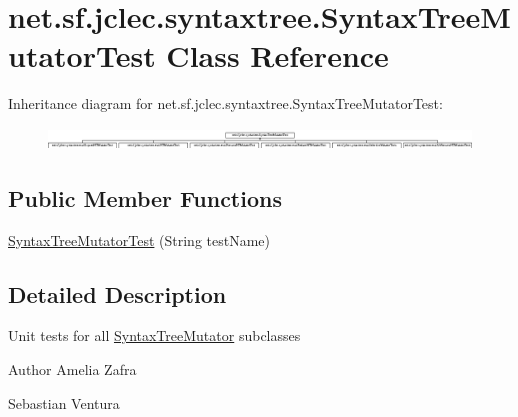 \hypertarget{classnet_1_1sf_1_1jclec_1_1syntaxtree_1_1_syntax_tree_mutator_test}{\section{net.\-sf.\-jclec.\-syntaxtree.\-Syntax\-Tree\-Mutator\-Test Class Reference}
\label{classnet_1_1sf_1_1jclec_1_1syntaxtree_1_1_syntax_tree_mutator_test}
}
Inheritance diagram for net.\-sf.\-jclec.\-syntaxtree.\-Syntax\-Tree\-Mutator\-Test\-:\begin{figure}[H]
\begin{center}
\leavevmode
\includegraphics[height=0.581516cm]{classnet_1_1sf_1_1jclec_1_1syntaxtree_1_1_syntax_tree_mutator_test}
\end{center}
\end{figure}
\subsection*{Public Member Functions}
\begin{DoxyCompactItemize}
\item 
\hyperlink{classnet_1_1sf_1_1jclec_1_1syntaxtree_1_1_syntax_tree_mutator_test_a60193d8579421146df20dbf3b2946672}{Syntax\-Tree\-Mutator\-Test} (String test\-Name)
\end{DoxyCompactItemize}


\subsection{Detailed Description}
Unit tests for all \hyperlink{classnet_1_1sf_1_1jclec_1_1syntaxtree_1_1_syntax_tree_mutator}{Syntax\-Tree\-Mutator} subclasses

\begin{DoxyAuthor}{Author}
Amelia Zafra 

Sebastian Ventura 
\end{DoxyAuthor}


